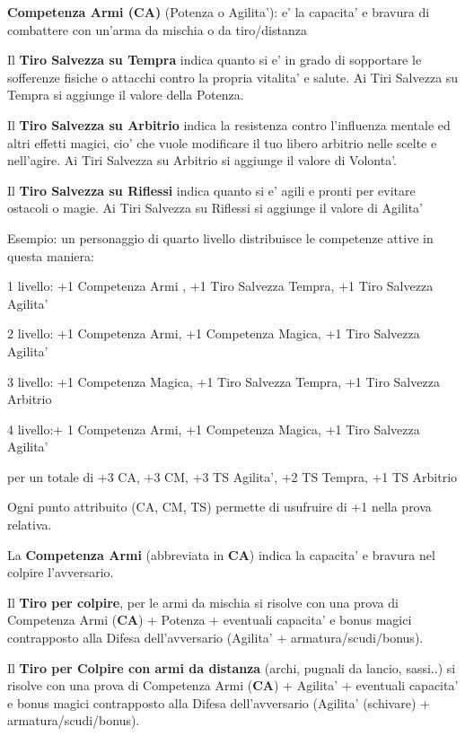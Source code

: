 \documentclass[a4paper,11pt,twoside,openany]{dndbook}
\begin{document}
\textbf{Competenza Armi (CA)} (Potenza o Agilita'): e' la capacita' e bravura di combattere con un'arma da mischia o da tiro/distanza

Il \textbf{Tiro Salvezza su Tempra} indica quanto si e' in grado di sopportare le sofferenze fisiche o attacchi contro la propria vitalita' e salute. Ai Tiri Salvezza su Tempra si aggiunge il valore della Potenza. 

Il \textbf{Tiro Salvezza su Arbitrio} indica la resistenza contro l'influenza mentale ed altri effetti magici, cio' che vuole modificare il tuo libero arbitrio nelle scelte e nell'agire. Ai Tiri Salvezza su Arbitrio si aggiunge il valore di Volonta'.

Il \textbf{Tiro Salvezza su Riflessi} indica quanto si e' agili e pronti per evitare ostacoli o magie. Ai Tiri Salvezza su Riflessi si aggiunge il valore di Agilita'

\bigskip

Esempio: un personaggio di quarto livello distribuisce le competenze
attive in questa maniera:

1 livello: +1 Competenza Armi , +1 Tiro Salvezza Tempra, +1 Tiro Salvezza Agilita'

2 livello: +1 Competenza Armi, +1 Competenza Magica, +1 Tiro Salvezza Agilita'

3 livello: +1 Competenza Magica, +1 Tiro Salvezza Tempra, +1 Tiro Salvezza Arbitrio

4 livello:+ 1 Competenza Armi, +1 Competenza Magica, +1 Tiro Salvezza Agilita'

per un totale di +3 CA, +3 CM, +3 TS Agilita', +2 TS Tempra, +1 TS Arbitrio

\bigskip

Ogni punto attribuito (CA, CM, TS) permette di usufruire di +1 nella prova relativa.

La \textbf{Competenza Armi} (abbreviata in \textbf{CA}) indica la capacita' e bravura nel colpire l'avversario.

Il \textbf{Tiro per colpire}, per le armi da mischia si risolve con una prova di Competenza Armi (\textbf{CA}) + Potenza + eventuali capacita' e bonus magici contrapposto alla Difesa dell'avversario (Agilita' + armatura/scudi/bonus).

Il \textbf{Tiro per Colpire con armi da distanza} (archi, pugnali da lancio, sassi..) si risolve con una prova di Competenza Armi (\textbf{CA}) + Agilita' + eventuali capacita' e bonus magici contrapposto alla Difesa dell'avversario (Agilita' (schivare) + armatura/scudi/bonus).
\end{document}
